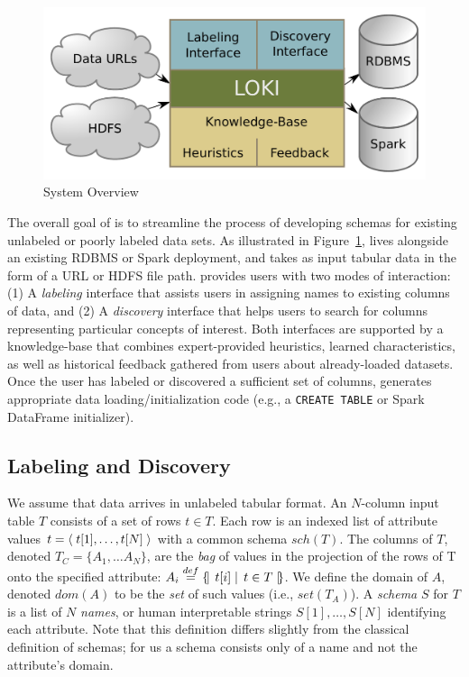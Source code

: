 
\begin{figure}
\centering
\includegraphics[width=0.8\columnwidth]{graphics/system.pdf}
\caption{System Overview}
\label{fig:overview}
\trimfigurespacing
\end{figure}

The overall goal of \systemname is to streamline the process of developing schemas for existing unlabeled or poorly labeled data sets.  
As illustrated in Figure~\ref{fig:overview}, \systemname lives alongside an existing RDBMS or Spark deployment, and takes as input tabular data in the form of a URL or HDFS file path.
\systemname provides users with two modes of interaction: (1) A \emph{labeling} interface that assists users in assigning names to existing columns of data, and (2) A \emph{discovery} interface that helps users to search for columns representing particular concepts of interest.  
Both interfaces are supported by a knowledge-base that combines expert-provided heuristics, learned characteristics, as well as historical feedback gathered from users about already-loaded datasets.
Once the user has labeled or discovered a sufficient set of columns, \systemname generates appropriate data loading/initialization code (e.g., a \texttt{CREATE TABLE} or Spark DataFrame initializer).  


\subsection{Labeling and Discovery}

We assume that data arrives in unlabeled tabular format.  
An $N$-column input table $T$ consists of a set of rows $t \in T$.
Each row is an indexed list of attribute values $t = \left<\;{t[1], \ldots, t[N]}\;\right>$ with a common schema $sch(T)$.
The columns of $T$, denoted $T_C = \{A_1, \ldots A_N\}$, are the \emph{bag} of values in the projection of the rows of T onto the specified attribute: $A_i \overset{def}{=} \left\{\!\left|\left.\;{t[i]}\;\right|\;{t \in T}\;\right|\!\right\}$.
We define the domain of $A$, denoted $dom(A)$ to be the \emph{set} of such values (i.e., $set(T_A)$).  
A \emph{schema} $S$ for $T$ is a list of $N$ \emph{names}, or human interpretable strings $S[1], \ldots, S[N]$ identifying each attribute.
Note that this definition differs slightly from the classical definition of schemas; for us a schema consists only of a name and not the attribute's domain.

